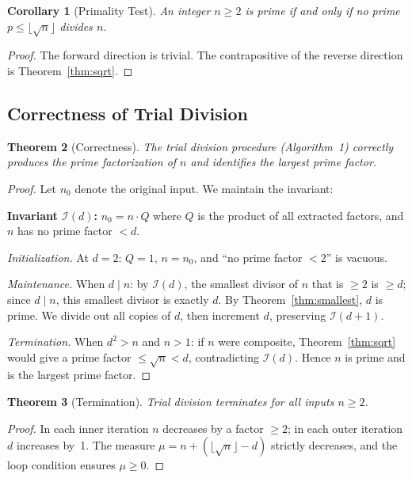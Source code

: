 \documentclass[11pt]{article}
\newtheorem{theorem}{Theorem}
\newtheorem{corollary}[theorem]{Corollary}
\begin{document}
\begin{corollary}[Primality Test]
\label{cor:prime-test}
An integer $n \ge 2$ is prime if and only if no prime $p \le \lfloor\sqrt{n}\rfloor$ divides $n$.
\end{corollary}

\begin{proof}
The forward direction is trivial. The contrapositive of the reverse direction is Theorem~\ref{thm:sqrt}.
\end{proof}

\subsection{Correctness of Trial Division}

\begin{theorem}[Correctness]
\label{thm:correct}
The trial division procedure (Algorithm~1) correctly produces the prime factorization of $n$ and identifies the largest prime factor.
\end{theorem}

\begin{proof}
Let $n_0$ denote the original input. We maintain the invariant:

\smallskip
\noindent\textbf{Invariant $\mathcal{I}(d)$:} $n_0 = n \cdot Q$ where $Q$ is the product of all extracted factors, and $n$ has no prime factor $< d$.
\smallskip

\emph{Initialization.} At $d=2$: $Q=1$, $n = n_0$, and ``no prime factor $< 2$'' is vacuous.

\emph{Maintenance.} When $d \mid n$: by $\mathcal{I}(d)$, the smallest divisor of $n$ that is $\ge 2$ is $\ge d$; since $d \mid n$, this smallest divisor is exactly $d$. By Theorem~\ref{thm:smallest}, $d$ is prime. We divide out all copies of $d$, then increment $d$, preserving $\mathcal{I}(d+1)$.

\emph{Termination.} When $d^2 > n$ and $n > 1$: if $n$ were composite, Theorem~\ref{thm:sqrt} would give a prime factor $\le \sqrt{n} < d$, contradicting $\mathcal{I}(d)$. Hence $n$ is prime and is the largest prime factor.
\end{proof}

\begin{theorem}[Termination]
\label{thm:term}
Trial division terminates for all inputs $n \ge 2$.
\end{theorem}

\begin{proof}
In each inner iteration $n$ decreases by a factor $\ge 2$; in each outer iteration $d$ increases by~1. The measure $\mu = n + (\lfloor\sqrt{n}\rfloor - d)$ strictly decreases, and the loop condition ensures $\mu \ge 0$.
\end{proof}
\end{document}
